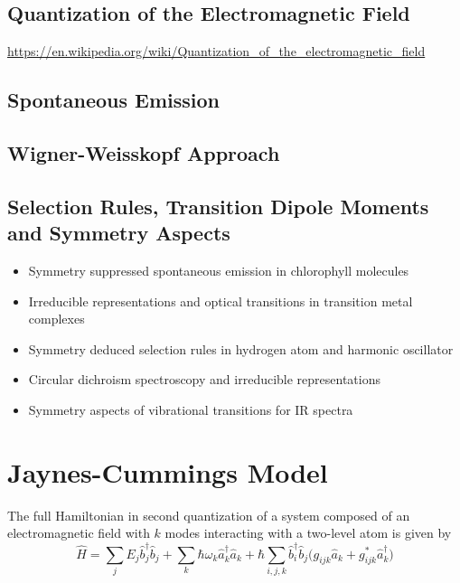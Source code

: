\documentclass[9pt]{report}
\begin{document}
\subsection{Quantization of the Electromagnetic Field}
\url{https://en.wikipedia.org/wiki/Quantization_of_the_electromagnetic_field}

\subsection{Spontaneous Emission}

\subsection{Wigner-Weisskopf Approach}



\subsection{Selection Rules, Transition Dipole Moments and Symmetry Aspects}
\begin{itemize}
	\item Symmetry suppressed spontaneous emission in chlorophyll molecules
	\item Irreducible representations and optical transitions in transition metal complexes
	\item Symmetry deduced selection rules in hydrogen atom and harmonic oscillator
	\item Circular dichroism spectroscopy and irreducible representations
	\item Symmetry aspects of vibrational transitions for IR spectra
\end{itemize}









\section{Jaynes-Cummings Model}

The full Hamiltonian in second quantization of a system composed of an electromagnetic field with $k$ modes interacting with a two-level atom is given by
\begin{equation}
\hat{H}=\sum_{j}E_{j}\hat{b}_{j}^{\dagger}\hat{b}_{j} +\sum_{k}\hbar\omega_{k}\hat{a}_{k}^{\dagger}\hat{a}_{k} +\hbar\sum_{i,j,k}\hat{b}_{i}^{\dagger}\hat{b}_{j}\big(g_{ijk}\hat{a}_{k}+g_{ijk}^{*}\hat{a}_{k}^{\dagger}\big)
\end{equation}
\end{document}
